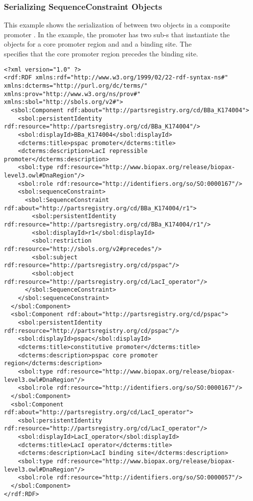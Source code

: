 \subsubsection{Serializing SequenceConstraint Objects}
This example shows the serialization of  between two  objects in a composite promoter . In the example, the promoter  has two sub-s that instantiate the  objects for a core promoter region and and a binding site. The\\
 specifies that the core promoter region precedes the binding site.
\begin{lstlisting}
<?xml version="1.0" ?>
<rdf:RDF xmlns:rdf="http://www.w3.org/1999/02/22-rdf-syntax-ns#" xmlns:dcterms="http://purl.org/dc/terms/" xmlns:prov="http://www.w3.org/ns/prov#" xmlns:sbol="http://sbols.org/v2#">
  <sbol:Component rdf:about="http://partsregistry.org/cd/BBa_K174004">
    <sbol:persistentIdentity rdf:resource="http://partsregistry.org/cd/BBa_K174004"/>
    <sbol:displayId>BBa_K174004</sbol:displayId>
    <dcterms:title>pspac promoter</dcterms:title>
    <dcterms:description>LacI repressible promoter</dcterms:description>
    <sbol:type rdf:resource="http://www.biopax.org/release/biopax-level3.owl#DnaRegion"/>
    <sbol:role rdf:resource="http://identifiers.org/so/SO:0000167"/>
    <sbol:sequenceConstraint>
      <sbol:SequenceConstraint rdf:about="http://partsregistry.org/cd/BBa_K174004/r1">
        <sbol:persistentIdentity rdf:resource="http://partsregistry.org/cd/BBa_K174004/r1"/>
        <sbol:displayId>r1</sbol:displayId>
        <sbol:restriction rdf:resource="http://sbols.org/v2#precedes"/>
        <sbol:subject rdf:resource="http://partsregistry.org/cd/pspac"/>
        <sbol:object rdf:resource="http://partsregistry.org/cd/LacI_operator"/>
      </sbol:SequenceConstraint>
    </sbol:sequenceConstraint>
  </sbol:Component>
  <sbol:Component rdf:about="http://partsregistry.org/cd/pspac">
    <sbol:persistentIdentity rdf:resource="http://partsregistry.org/cd/pspac"/>
    <sbol:displayId>pspac</sbol:displayId>
    <dcterms:title>constitutive promoter</dcterms:title>
    <dcterms:description>pspac core promoter region</dcterms:description>
    <sbol:type rdf:resource="http://www.biopax.org/release/biopax-level3.owl#DnaRegion"/>
    <sbol:role rdf:resource="http://identifiers.org/so/SO:0000167"/>
  </sbol:Component>
  <sbol:Component rdf:about="http://partsregistry.org/cd/LacI_operator">
    <sbol:persistentIdentity rdf:resource="http://partsregistry.org/cd/LacI_operator"/>
    <sbol:displayId>LacI_operator</sbol:displayId>
    <dcterms:title>LacI operator</dcterms:title>
    <dcterms:description>LacI binding site</dcterms:description>
    <sbol:type rdf:resource="http://www.biopax.org/release/biopax-level3.owl#DnaRegion"/>
    <sbol:role rdf:resource="http://identifiers.org/so/SO:0000057"/>
  </sbol:Component>
</rdf:RDF>
\end{lstlisting}

